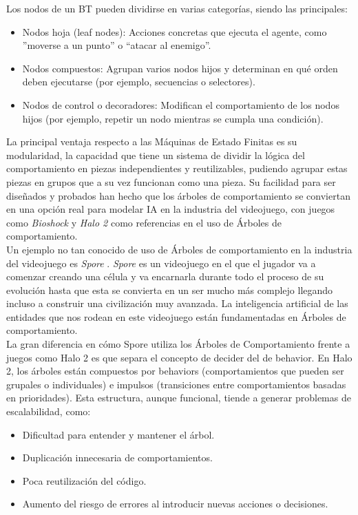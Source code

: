 Los nodos de un BT pueden dividirse en varias categorías, siendo las principales:

\begin{itemize}
\item Nodos hoja (leaf nodes): Acciones concretas que ejecuta el agente, como ''moverse a un punto'' o ``atacar al enemigo''.
\item Nodos compuestos: Agrupan varios nodos hijos y determinan en qué orden deben ejecutarse (por ejemplo, secuencias o selectores).
\item Nodos de control o decoradores: Modifican el comportamiento de los nodos hijos (por ejemplo, repetir un nodo mientras se cumpla una condición).
\end{itemize}

La principal ventaja respecto a las Máquinas de Estado Finitas es su modularidad, la capacidad que tiene un sistema de dividir la lógica del comportamiento en piezas independientes y reutilizables, pudiendo agrupar estas piezas en grupos que a su vez funcionan como una pieza. Su facilidad para ser diseñados y probados han hecho que los árboles de comportamiento se conviertan en una opción real para modelar IA en la industria del videojuego, con juegos como \textit{Bioshock} \citep{bioshock} y \textit{Halo 2} \citep{halo2} como referencias en el uso de Árboles de comportamiento.\\

Un ejemplo no tan conocido de uso de Árboles de comportamiento en la industria del videojuego es \textit{Spore} \citep{spore}. \textit{Spore} es un videojuego en el que el jugador va a comenzar creando una célula y va encarnarla durante todo el proceso de su evolución hasta que esta se convierta en un ser mucho más complejo llegando incluso a construir una civilización muy avanzada. La inteligencia artificial de las entidades que nos rodean en este videojuego están fundamentadas en Árboles de comportamiento.\\

La gran diferencia en cómo Spore utiliza los Árboles de Comportamiento frente a juegos como Halo 2 es que separa el concepto de decider del de behavior. En Halo 2, los árboles están compuestos por behaviors (comportamientos que pueden ser grupales o individuales) e impulsos (transiciones entre comportamientos basadas en prioridades). Esta estructura, aunque funcional, tiende a generar problemas de escalabilidad, como:
\begin{itemize}
	\item Dificultad para entender y mantener el árbol.
	\item Duplicación innecesaria de comportamientos.
	\item Poca reutilización del código.
	\item Aumento del riesgo de errores al introducir nuevas acciones o decisiones.
\end{itemize}

